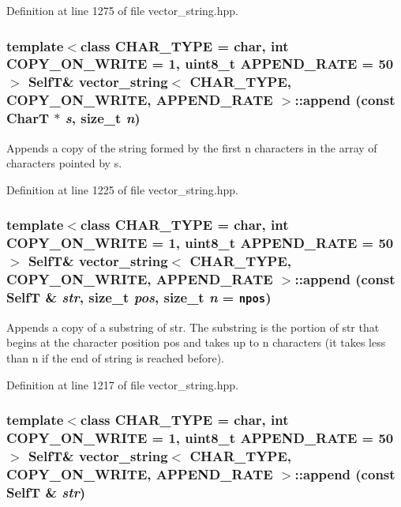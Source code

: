 Definition at line 1275 of file vector\_\-string.hpp.\hypertarget{classvector__string_680eb4134425df7845f49bcdc852bee7}{
\subsubsection[{append}]{\setlength{\rightskip}{0pt plus 5cm}template$<$class CHAR\_\-TYPE  = char, int COPY\_\-ON\_\-WRITE = 1, uint8\_\-t APPEND\_\-RATE = 50$>$ {\bf SelfT}\& {\bf vector\_\-string}$<$ CHAR\_\-TYPE, COPY\_\-ON\_\-WRITE, APPEND\_\-RATE $>$::append (const CharT $\ast$ {\em s}, \/  size\_\-t {\em n})}}
\label{classvector__string_680eb4134425df7845f49bcdc852bee7}


Appends a copy of the string formed by the first n characters in the array of characters pointed by s. 

Definition at line 1225 of file vector\_\-string.hpp.\hypertarget{classvector__string_e6255b18101142fcc319bff78d143e55}{
\subsubsection[{append}]{\setlength{\rightskip}{0pt plus 5cm}template$<$class CHAR\_\-TYPE  = char, int COPY\_\-ON\_\-WRITE = 1, uint8\_\-t APPEND\_\-RATE = 50$>$ {\bf SelfT}\& {\bf vector\_\-string}$<$ CHAR\_\-TYPE, COPY\_\-ON\_\-WRITE, APPEND\_\-RATE $>$::append (const {\bf SelfT} \& {\em str}, \/  size\_\-t {\em pos}, \/  size\_\-t {\em n} = {\tt {\bf npos}})}}
\label{classvector__string_e6255b18101142fcc319bff78d143e55}


Appends a copy of a substring of str. The substring is the portion of str that begins at the character position pos and takes up to n characters (it takes less than n if the end of string is reached before). 

Definition at line 1217 of file vector\_\-string.hpp.\hypertarget{classvector__string_8117d617b230c2dc55045b58a026a70c}{
\subsubsection[{append}]{\setlength{\rightskip}{0pt plus 5cm}template$<$class CHAR\_\-TYPE  = char, int COPY\_\-ON\_\-WRITE = 1, uint8\_\-t APPEND\_\-RATE = 50$>$ {\bf SelfT}\& {\bf vector\_\-string}$<$ CHAR\_\-TYPE, COPY\_\-ON\_\-WRITE, APPEND\_\-RATE $>$::append (const {\bf SelfT} \& {\em str})}}
\label{classvector__string_8117d617b230c2dc55045b58a026a70c}


